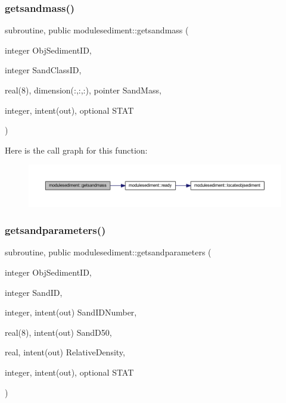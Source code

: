 \subsubsection{\texorpdfstring{getsandmass()}{getsandmass()}}
{\footnotesize\ttfamily subroutine, public modulesediment\+::getsandmass (\begin{DoxyParamCaption}\item[{integer}]{Obj\+Sediment\+ID,  }\item[{integer}]{Sand\+Class\+ID,  }\item[{real(8), dimension(\+:,\+:,\+:), pointer}]{Sand\+Mass,  }\item[{integer, intent(out), optional}]{S\+T\+AT }\end{DoxyParamCaption})}

Here is the call graph for this function\+:\nopagebreak
\begin{figure}[H]
\begin{center}
\leavevmode
\includegraphics[width=350pt]{namespacemodulesediment_a7bb4238fb2af1033061fd9f1fdf674dc_cgraph}
\end{center}
\end{figure}
\mbox{\label{namespacemodulesediment_a283894d1d09fefa91f63082646eea486}} 
\subsubsection{\texorpdfstring{getsandparameters()}{getsandparameters()}}
{\footnotesize\ttfamily subroutine, public modulesediment\+::getsandparameters (\begin{DoxyParamCaption}\item[{integer}]{Obj\+Sediment\+ID,  }\item[{integer}]{Sand\+ID,  }\item[{integer, intent(out)}]{Sand\+I\+D\+Number,  }\item[{real(8), intent(out)}]{Sand\+D50,  }\item[{real, intent(out)}]{Relative\+Density,  }\item[{integer, intent(out), optional}]{S\+T\+AT }\end{DoxyParamCaption})}

